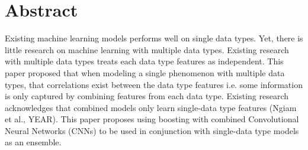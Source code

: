 
\section{Abstract}

Existing machine learning models performs well on single data types.
Yet, there is little research on machine learning with multiple data types.
Existing research with multiple data types treats each data type features as independent.
This paper proposed that when modeling a single phenomenon with multiple data types, that correlations exist between the data type features
i.e. some information is only captured by combining features from each data type.
Existing research acknowledges that combined models only learn single-data type features (Ngiam et al., YEAR).
This paper proposes using boosting with combined Convolutional Neural Networks (CNNs) to be used in conjunction with single-data type models as an ensemble.  












